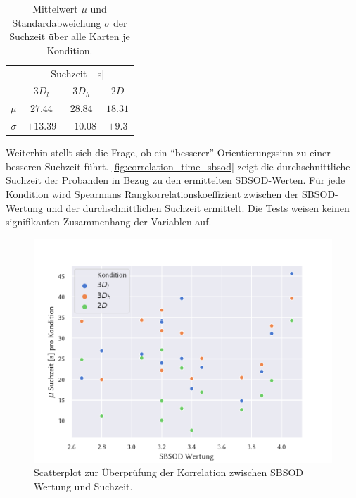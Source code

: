 \begin{table}[h!]
    \centering
    \caption{Mittelwert $\mu$ und Standardabweichung $\sigma$ der Suchzeit über alle Karten je Kondition.}
    \label{tab:searchtime_overview}
    \begin{tabular}{rccc}
        \toprule
        {} & \multicolumn{3}{c}{Suchzeit [\SI{}{\second}]} \\
        {} &          $3D_l$ &          $3D_h$ &          $2D$ \\
        \midrule
        $\mu$    &  $\num{27.44}$     &  $\num{28.84}$     &  $\num{18.31}$ \\
        $\sigma$ &  $\pm \num{13.39}$ &  $\pm \num{10.08}$ &   $\pm \num{9.3}$ \\
        \bottomrule
    \end{tabular}
\end{table}

Weiterhin stellt sich die Frage, ob ein \enquote{besserer} Orientierungssinn zu einer besseren Suchzeit führt.
\autoref{fig:correlation_time_sbsod} zeigt die durchschnittliche Suchzeit der Probanden in Bezug zu den ermittelten SBSOD-Werten.
Für jede Kondition wird Spearmans Rangkorrelationskoeffizient zwischen der SBSOD-Wertung und der durchschnittlichen Suchzeit ermittelt.
Die Tests weisen keinen signifikanten Zusammenhang der Variablen auf.
\begin{figure}[ht]
    \centering
    \includegraphics[width=\linewidth]{figures/analysis/correlation_time_sbsod_scatter}
    \caption{Scatterplot zur Überprüfung der Korrelation zwischen SBSOD Wertung und Suchzeit.}
    \label{fig:correlation_time_sbsod}
\end{figure}

